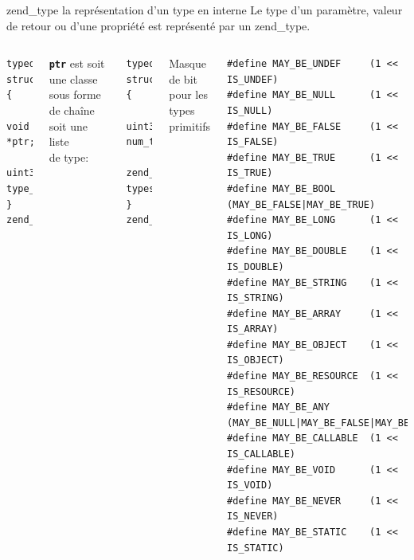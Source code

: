 \documentclass[10pt]{beamer}
\begin{document}
\begin{frame}[fragile]{zend\_type la représentation d'un type en interne}
    Le type d'un paramètre, valeur de retour ou d'une propriété est représenté par un \alert{zend\_type}.
    \begin{columns}[T,onlytextwidth]
            \begin{verbatim}
typedef struct {
  void *ptr;
  uint32_t type_mask;
} zend_type;
            \end{verbatim}
            \texttt{\textbf{ptr}} est soit une classe sous forme de chaîne
            soit une liste \\de type:
            \begin{verbatim}
typedef struct {
  uint32_t num_types;
  zend_type types[1];
} zend_type_list;
            \end{verbatim}
    
            Masque de bit pour les types primitifs
            \begin{verbatim}
#define MAY_BE_UNDEF     (1 << IS_UNDEF)
#define MAY_BE_NULL      (1 << IS_NULL)
#define MAY_BE_FALSE     (1 << IS_FALSE)
#define MAY_BE_TRUE      (1 << IS_TRUE)
#define MAY_BE_BOOL      (MAY_BE_FALSE|MAY_BE_TRUE)
#define MAY_BE_LONG      (1 << IS_LONG)
#define MAY_BE_DOUBLE    (1 << IS_DOUBLE)
#define MAY_BE_STRING    (1 << IS_STRING)
#define MAY_BE_ARRAY     (1 << IS_ARRAY)
#define MAY_BE_OBJECT    (1 << IS_OBJECT)
#define MAY_BE_RESOURCE  (1 << IS_RESOURCE)
#define MAY_BE_ANY       (MAY_BE_NULL|MAY_BE_FALSE|MAY_BE_TRUE|MAY_BE_LONG|MAY_BE_DOUBLE|MAY_BE_STRING|MAY_BE_ARRAY|MAY_BE_OBJECT|MAY_BE_RESOURCE)
#define MAY_BE_CALLABLE  (1 << IS_CALLABLE)
#define MAY_BE_VOID      (1 << IS_VOID)
#define MAY_BE_NEVER     (1 << IS_NEVER)
#define MAY_BE_STATIC    (1 << IS_STATIC)
            \end{verbatim}
    \end{columns}
\end{frame}
\end{document}
